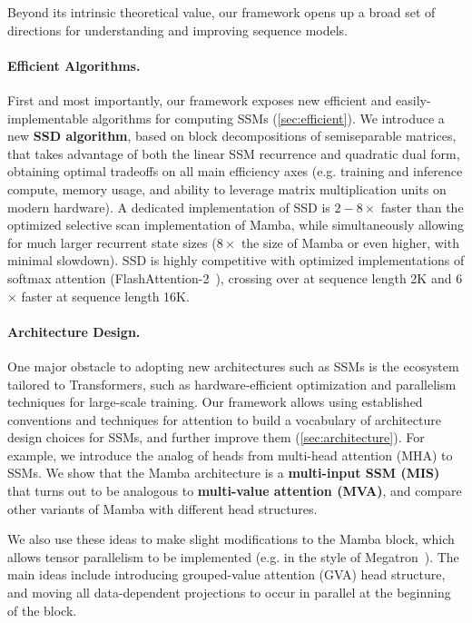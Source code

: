 Beyond its intrinsic theoretical value, our framework opens up a broad set of directions for understanding and improving sequence models.

\paragraph{Efficient Algorithms.} First and most importantly, our framework exposes new efficient and easily-implementable algorithms for computing SSMs (\ref{sec:efficient}).
We introduce a new \textbf{SSD algorithm}, based on block decompositions of semiseparable matrices, that takes advantage of both the linear SSM recurrence and quadratic dual form, obtaining optimal tradeoffs on all main efficiency axes (e.g. training and inference compute, memory usage, and ability to leverage matrix multiplication units on modern hardware). A dedicated implementation of SSD is $2-8\times$ faster than the optimized selective scan implementation of Mamba, while simultaneously allowing for much larger recurrent state sizes ($8\times$ the size of Mamba or even higher, with minimal slowdown). SSD is highly competitive with optimized implementations of softmax attention (FlashAttention-2~\citep{dao2023flashattention2}), crossing over at sequence length 2K and 6$\times$ faster at sequence length 16K.

\paragraph{Architecture Design.} One major obstacle to adopting new architectures such as SSMs is the ecosystem tailored to Transformers, such as hardware-efficient optimization and parallelism techniques for large-scale training. Our framework allows using established conventions and techniques for attention to build a vocabulary of architecture design choices for SSMs, and further improve them (\ref{sec:architecture}).
For example, we introduce the analog of heads from multi-head attention (MHA) to SSMs. We show that the Mamba architecture is a \textbf{multi-input SSM (MIS)} that turns out to be analogous to \textbf{multi-value attention (MVA)}, and compare other variants of Mamba with different head structures.

We also use these ideas to make slight modifications to the Mamba block, which allows tensor parallelism to be implemented (e.g. in the style of Megatron~\citep{shoeybi2019megatron}).
The main ideas include introducing grouped-value attention (GVA) head structure, and moving all data-dependent projections to occur in parallel at the beginning of the block.

